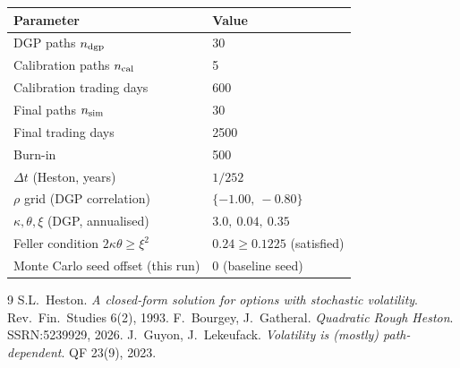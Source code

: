 \documentclass[11pt,a4paper]{article}
\begin{document}
\begin{center}\renewcommand{\arraystretch}{1.4}
\begin{tabular}{ll}\toprule Parameter & Value \\\midrule
DGP paths $n_{\rm dgp}$ & 30 \\
Calibration paths $n_{\rm cal}$ & 5 \\
Calibration trading days & 600 \\
Final paths $n_{\rm sim}$ & 30 \\
Final trading days & 2500 \\
Burn-in & 500 \\
$\Delta t$ (Heston, years) & $1/252$ \\
$\rho$ grid (DGP correlation) & $\{-1.00,\ -0.80\}$ \\
$\kappa,\theta,\xi$ (DGP, annualised) & $3.0,\ 0.04,\ 0.35$ \\
Feller condition $2\kappa\theta\geq\xi^2$ & $0.24\geq0.1225$ (satisfied) \\
Monte Carlo seed offset (this run) & $0$ (baseline seed) \\
\bottomrule\end{tabular}\end{center}

\begin{thebibliography}{9}
 S.L.\ Heston.
\textit{A closed-form solution for options with stochastic volatility}.
Rev.\ Fin.\ Studies 6(2), 1993.
 F.\ Bourgey, J.\ Gatheral.
\textit{Quadratic Rough Heston}. SSRN:5239929, 2026.
 J.\ Guyon, J.\ Lekeufack.
\textit{Volatility is (mostly) path-dependent}. QF 23(9), 2023.
\end{thebibliography}
\end{document}
